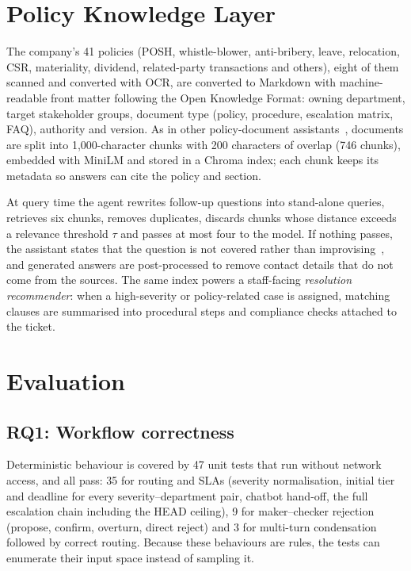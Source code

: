 \documentclass[conference]{IEEEtran}
\begin{document}
\section{Policy Knowledge Layer}
\label{sec:rag}

The company's 41 policies (POSH, whistle-blower, anti-bribery, leave, relocation, CSR, materiality, dividend,
related-party transactions and others), eight of them scanned and converted with OCR, are converted to Markdown with
machine-readable front matter following the Open Knowledge Format: owning department, target stakeholder groups,
document type (policy, procedure, escalation matrix, FAQ), authority and version. As in other policy-document
assistants~\cite{rahman2025policyrag,dayata2024carolinian}, documents are split into 1,000-character chunks with 200
characters of overlap (746 chunks), embedded with MiniLM and stored in a
Chroma index; each chunk keeps its metadata so answers can cite the policy and section.

At query time the agent rewrites follow-up questions into stand-alone queries, retrieves six chunks, removes
duplicates, discards chunks whose distance exceeds a relevance threshold $\tau$ and passes at most four to the
model. If nothing passes, the assistant states that the question is not covered rather than
improvising~\cite{akkiraju2024facts}, and generated answers are post-processed to remove contact details that do
not come from the sources. The same index powers a staff-facing \emph{resolution recommender}: when a high-severity
or policy-related case is assigned, matching clauses are summarised into procedural steps and compliance checks
attached to the ticket.

\section{Evaluation}
\label{sec:eval}

\subsection{RQ1: Workflow correctness}
Deterministic behaviour is covered by 47 unit tests that run without network access, and all pass: 35 for
routing and SLAs (severity normalisation, initial tier and deadline for every severity--department pair, chatbot
hand-off, the full escalation chain including the HEAD ceiling), 9 for maker--checker rejection (propose,
confirm, overturn, direct reject) and 3 for multi-turn condensation followed by correct routing. Because these
behaviours are rules, the tests can enumerate their input space instead of sampling it.
\end{document}
